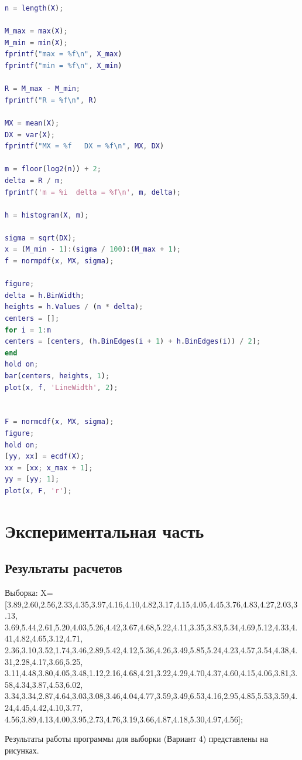\documentclass[12pt]{report}
\begin{document}
\begin{lstlisting}[language=Matlab]
n = length(X);

M_max = max(X);
M_min = min(X);
fprintf("max = %f\n", X_max)
fprintf("min = %f\n", X_min)

R = M_max - M_min;
fprintf("R = %f\n", R)

MX = mean(X);
DX = var(X);
fprintf("MX = %f   DX = %f\n", MX, DX)

m = floor(log2(n)) + 2;
delta = R / m;
fprintf('m = %i  delta = %f\n', m, delta);

h = histogram(X, m);

sigma = sqrt(DX);
x = (M_min - 1):(sigma / 100):(M_max + 1);
f = normpdf(x, MX, sigma);

figure;
delta = h.BinWidth;
heights = h.Values / (n * delta);
centers = [];
for i = 1:m
centers = [centers, (h.BinEdges(i + 1) + h.BinEdges(i)) / 2];
end
hold on;
bar(centers, heights, 1); 
plot(x, f, 'LineWidth', 2);


F = normcdf(x, MX, sigma);
figure;
hold on;
[yy, xx] = ecdf(X);
xx = [xx; x_max + 1];
yy = [yy; 1];
plot(x, F, 'r');
\end{lstlisting}

\chapter{Экспериментальная часть}

\section{Результаты расчетов}

Выборка: X=[3.89,2.60,2.56,2.33,4.35,3.97,4.16,4.10,4.82,3.17,4.15,4.05,4.45,3.76,4.83,4.27,2.03,3.13,\\3.69,5.44,2.61,5.20,4.03,5.26,4.42,3.67,4.68,5.22,4.11,3.35,3.83,5.34,4.69,5.12,4.33,4.41,4.82,4.65,3.12,4.71,\\2.36,3.10,3.52,1.74,3.46,2.89,5.42,4.12,5.36,4.26,3.49,5.85,5.24,4.23,4.57,3.54,4.38,4.31,2.28,4.17,3.66,5.25,\\3.11,4.48,3.80,4.05,3.48,1.12,2.16,4.68,4.21,3.22,4.29,4.70,4.37,4.60,4.15,4.06,3.81,3.58,4.34,3.87,4.53,6.02,\\3.34,3.34,2.87,4.64,3.03,3.08,3.46,4.04,4.77,3.59,3.49,6.53,4.16,2.95,4.85,5.53,3.59,4.24,4.45,4.42,4.10,3.77,\\4.56,3.89,4.13,4.00,3.95,2.73,4.76,3.19,3.66,4.87,4.18,5.30,4.97,4.56];


Результаты работы программы для выборки (Вариант 4) представлены на рисунках.
\end{document}
